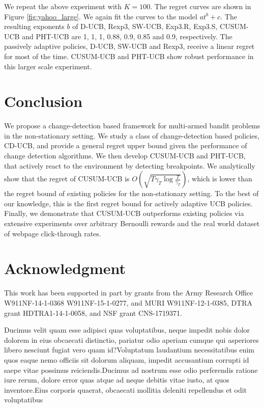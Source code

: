 \documentclass[letterpaper]{article}
\newcommand{\green}{}
\begin{document}
{\green
{}
We repeat the above experiment with $K=100$. The regret curves are shown in Figure \ref{fig:yahoo_large}. We again fit the curves to the model $at^b+c$. The resulting exponents $b$ of D-UCB, Rexp3, SW-UCB, Exp3.R, Exp3.S, CUSUM-UCB and PHT-UCB are 1, 1, 1, 0.88, 0.9, 0.85 and 0.9, respectively. The passively adaptive policies, D-UCB, SW-UCB and Rexp3, receive
a linear regret for most of the time. CUSUM-UCB and PHT-UCB show robust performance in this larger scale experiment.
}
\section{Conclusion}\label{sec:conclusion}
We propose a change-detection based framework for multi-armed bandit
problems in the non-stationary setting. We study a class of
change-detection based policies, CD-UCB, and provide a general regret
upper bound given the performance of change detection algorithms. We
then develop CUSUM-UCB and PHT-UCB, that actively react to the environment by
detecting breakpoints.
We analytically show that the regret of CUSUM-UCB is
$O(\sqrt{T\gamma_T\log{\frac{T}{\gamma_T}}})$, which is lower than the
regret bound of existing policies for the non-stationary setting.
To the best of our knowledge, this is the first regret bound for
actively adaptive UCB policies.
Finally, we demonstrate that CUSUM-UCB outperforms existing policies
via extensive experiments over arbitrary Bernoulli rewards and the
real world dataset of webpage click-through rates.

\section*{Acknowledgment}
This work has been supported in part by grants  from the Army Research Office  W911NF-14-1-0368 W911NF-15-1-0277, and MURI W911NF-12-1-0385, DTRA grant HDTRA1-14-1-0058, and NSF grant CNS-1719371.


Ducimus velit quam esse adipisci quas voluptatibus, neque impedit nobis dolor dolorem in eius obcaecati distinctio, pariatur odio aperiam cumque qui asperiores libero nesciunt fugiat vero quam id?Voluptatum laudantium necessitatibus enim quos eaque nemo officiis sit dolorum aliquam, impedit accusantium corrupti id saepe vitae possimus reiciendis.Ducimus ad nostrum esse odio perferendis ratione iure rerum, dolore error quas atque ad neque debitis vitae iusto, at quos inventore.Eius corporis quaerat, obcaecati mollitia deleniti repellendus et odit voluptatibus

\end{document}
